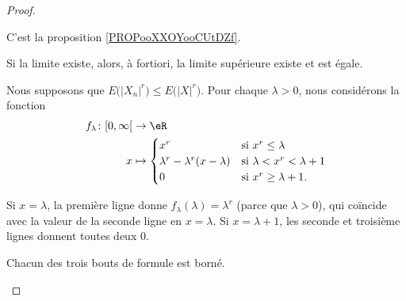 \begin{proof}
\begin{subproof}
		\spitem[\ref{SPITEMooUYTKooBClYcR} \( \Rightarrow\) \ref{SPITEMooQYLOooDiBvne}]

		C'est la proposition \ref{PROPooXXOYooCUtDZf}.

		\spitem[\ref{SPITEMooQYLOooDiBvne} \( \Rightarrow\) \ref{SPITEMooRVFAooXUNQlf}]

		Si la limite existe, alors, à fortiori, la limite supérieure existe et est égale.

		\spitem[\ref{SPITEMooRVFAooXUNQlf} \( \Rightarrow\) \ref{SPITEMooGKRVooQoDfKm}]

		Nous supposons que \( E\big( | X_n |^r \big)\leq E\big( | X |^r \big)\). Pour chaque \( \lambda>0\), nous considérons la fonction
		\begin{equation}
			\begin{aligned}
				f_{\lambda}\colon \mathopen[ 0,\infty\mathclose[ & \to \eR                                                                  \\
				x                                                & \mapsto \begin{cases}
					                                                           x^r                            & \text{si }  x^r\leq \lambda     \\
					                                                           \lambda^r-\lambda^r(x-\lambda) & \text{si }\lambda<x^r<\lambda+1 \\
					                                                           0                              & \text{si } x^r\geq\lambda+1.
				                                                           \end{cases}
			\end{aligned}
		\end{equation}
		\begin{subproof}
			Si \( x=\lambda\), la première ligne donne \( f_{\lambda}(\lambda)=\lambda^r\) (parce que \( \lambda>0\)), qui coïncide avec la valeur de la seconde ligne en \( x=\lambda\). Si \( x=\lambda+1\), les seconde et troisième lignes donnent toutes deux \( 0\).

			Chacun des trois bouts de formule est borné.


\end{subproof}
\end{subproof}
\end{proof}
